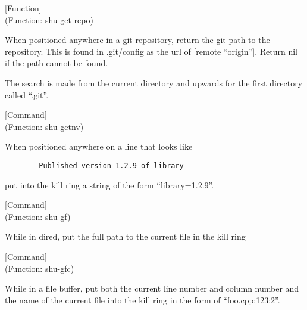 \vspace{1em}
\noindent
{}
\usebox{\funcname}
 \hfill [Function]\\%
 (Function: shu-get-repo)

\begin{doc-string}
When positioned anywhere in a git repository, return the git path to the
repository.  This is found in .git/config as the url of [remote ``origin''].
Return nil if the path cannot be found.

The search is made from the current directory and upwards for the first
directory called ``.git''.
\end{doc-string}

\vspace{1em}
\noindent
{}
\usebox{\funcname}
 \hfill [Command]\\%
 (Function: shu-getnv)

\begin{doc-string}
When positioned anywhere on a line that looks like

\small{\begin{verbatim}
        Published version 1.2.9 of library
\end{verbatim}}

put into the kill ring  a string of the form ``library=1.2.9''.
\end{doc-string}

\vspace{1em}
\noindent
{}
\usebox{\funcname}
 \hfill [Command]\\%
 (Function: shu-gf)

\begin{doc-string}
While in dired, put the full path to the current file in the kill ring
\end{doc-string}

\vspace{1em}
\noindent
{}
\usebox{\funcname}
 \hfill [Command]\\%
 (Function: shu-gfc)

\begin{doc-string}
While in a file buffer, put both the current line number and
column number and the name of the current file into the kill ring
in the form of ``foo.cpp:123:2''.
\end{doc-string}

